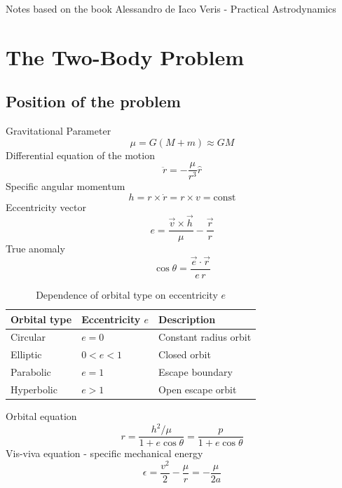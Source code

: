 \documentclass[11pt]{article}
\begin{document}
Notes based on the book Alessandro de Iaco Veris - Practical Astrodynamics
\section{The Two-Body Problem}
\subsection{Position of the problem}
Gravitational Parameter
\begin{equation}
    \mu = G(M+m) \approx GM
\end{equation}
Differential equation of the motion
\begin{equation}
    \ddot{r} = -\frac{\mu}{r^3} \hat{r}
\end{equation}
Specific angular momentum
\begin{equation}
    h = r \times \dot{r} = r \times v = \text{const}
\end{equation}
Eccentricity vector
\begin{equation}
    e = \frac{\vec{v} \times \vec{h}}{\mu} - \frac{\vec{r}}{r}
\end{equation}
True anomaly
\begin{equation}
    \cos \theta = \frac{\vec{e}\cdot\vec{r}}{e\,r}
\end{equation}
\begin{table}[h]
    \centering
    \caption{Dependence of orbital type on eccentricity $e$}
    \begin{tabular}{lll}
        \hline
        Orbital type & Eccentricity $e$ & Description           \\
        \hline
        Circular     & $e = 0$          & Constant radius orbit \\
        Elliptic     & $0 < e < 1$      & Closed orbit          \\
        Parabolic    & $e = 1$          & Escape boundary       \\
        Hyperbolic   & $e > 1$          & Open escape orbit     \\
        \hline
    \end{tabular}
\end{table}
Orbital equation
\begin{equation}
    r = \frac{h^2/\mu}{1 + e\cos\theta} = \frac{p}{1 + e\cos\theta}
\end{equation}
Vis-viva equation - specific mechanical energy
\begin{equation}
    \epsilon = \frac{v^2}{2} - \frac{\mu}{r} = -\frac{\mu}{2a}
\end{equation}
\end{document}
